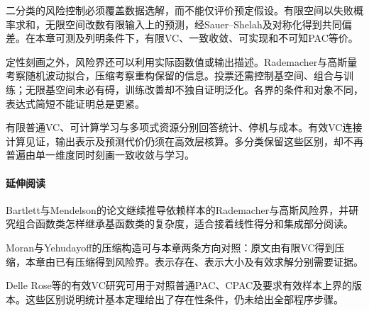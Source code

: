 二分类的风险控制必须覆盖数据选解，而不能仅评价预定假设。有限空间以失败概率求和，无限空间改数有限输入上的预测，经Sauer--Shelah及对称化得到共同偏差。在本章可测及列明条件下，有限VC、一致收敛、可实现和不可知PAC等价。

定性刻画之外，风险界还可以利用实际函数值或输出描述。Rademacher与高斯量考察随机波动拟合，压缩考察重构保留的信息。投票还需控制基空间、组合与训练；无限基空间未必有碍，训练改善却不独自证明泛化。各界的条件和对象不同，表达式简短不能证明总是更紧。

有限普通VC、可计算学习与多项式资源分别回答统计、停机与成本。有效VC连接计算见证，输出表示及预测代价仍须在高效层核算。多分类保留这些区别，却不再普遍由单一维度同时刻画一致收敛与学习。

\paragraph{延伸阅读}
Bartlett与Mendelson的论文继续推导依赖样本的Rademacher与高斯风险界，并研究组合函数类怎样继承基函数类的复杂度，适合接着线性得分和集成部分阅读。

Moran与Yehudayoff的压缩构造可与本章两条方向对照：原文由有限VC得到压缩，本章由已有压缩得到风险界。表示存在、表示大小及有效求解分别需要证据。

Delle Rose等的有效VC研究可用于对照普通PAC、CPAC及要求有效样本上界的版本。这些区别说明统计基本定理给出了存在性条件，仍未给出全部程序步骤。
